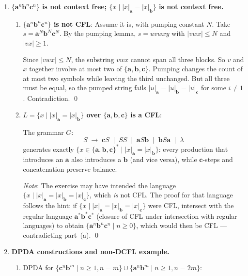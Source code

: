 \begin{enumerate}[{10.}1. ]
\item \textbf{$\{\pmb{a}^n\pmb{b}^n\pmb{c}^n\}$ is not context free; $\{x \mid |x|_{\pmb{a}}=|x|_{\pmb{b}}\}$ is not context free.}

\begin{enumerate}
\item \textbf{$\{\pmb{a}^n\pmb{b}^n\pmb{c}^n\}$ is not CFL}: Assume it is, with pumping constant $N$. Take $s=\pmb{a}^N\pmb{b}^N\pmb{c}^N$. By the pumping lemma, $s=uvwxy$ with $|vwx|\leq N$ and $|vx|\geq 1$.

Since $|vwx|\leq N$, the substring $vwx$ cannot span all three blocks. So $v$ and $x$ together involve at most two of $\{\pmb{a},\pmb{b},\pmb{c}\}$. Pumping changes the count of at most two symbols while leaving the third unchanged. But all three must be equal, so the pumped string fails $|u|_{\pmb{a}}=|u|_{\pmb{b}}=|u|_{\pmb{c}}$ for some $i\neq 1$. Contradiction. \qed

\item \textbf{$L = \{x \mid |x|_{\pmb{a}}=|x|_{\pmb{b}}\}$ over $\{\pmb{a},\pmb{b},\pmb{c}\}$ is a CFL}:

The grammar $G$:
\[
S \;\to\; \pmb{c}S \;\mid\; SS \;\mid\; \pmb{a}S\pmb{b} \;\mid\; \pmb{b}S\pmb{a} \;\mid\; \lambda
\]
generates exactly $\{x\in\{\pmb{a},\pmb{b},\pmb{c}\}^*\mid |x|_{\pmb{a}}=|x|_{\pmb{b}}\}$: every production that introduces an $\pmb{a}$ also introduces a $\pmb{b}$ (and vice versa), while $\pmb{c}$-steps and concatenation preserve balance.

\textit{Note}: The exercise may have intended the language $\{x\mid|x|_{\pmb{a}}=|x|_{\pmb{b}}=|x|_{\pmb{c}}\}$, which \emph{is} not CFL. The proof for that language follows the hint: if $\{x\mid|x|_{\pmb{a}}=|x|_{\pmb{b}}=|x|_{\pmb{c}}\}$ were CFL, intersect with the regular language $\pmb{a}^*\pmb{b}^*\pmb{c}^*$ (closure of CFL under intersection with regular languages) to obtain $\{\pmb{a}^n\pmb{b}^n\pmb{c}^n\mid n\geq 0\}$, which would then be CFL --- contradicting part~(a). \qed
\end{enumerate}

\item \textbf{DPDA constructions and non-DCFL example.}

\begin{enumerate}
\item DPDA for $\{\pmb{c}^n\pmb{b}^m \mid n\geq 1, n=m\} \cup \{\pmb{a}^n\pmb{b}^m \mid n\geq 1, n=2m\}$:


\end{enumerate}
\end{enumerate}

